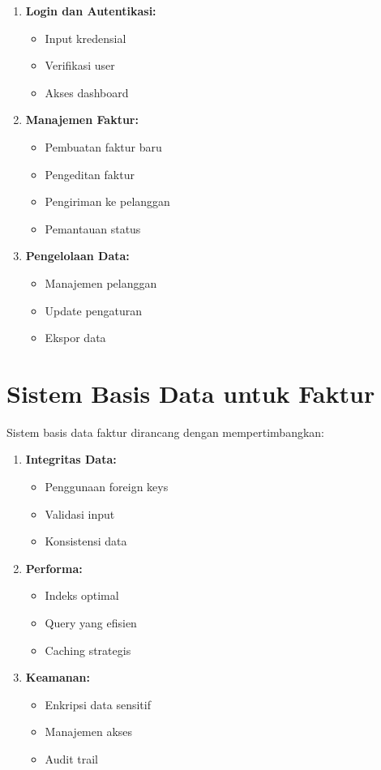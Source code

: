\documentclass[a4paper]{report}
\begin{document}
\begin{enumerate}
\item \textbf{Login dan Autentikasi:}
    \begin{itemize}
    \item Input kredensial
    \item Verifikasi user
    \item Akses dashboard
    \end{itemize}

\item \textbf{Manajemen Faktur:}
    \begin{itemize}
    \item Pembuatan faktur baru
    \item Pengeditan faktur
    \item Pengiriman ke pelanggan
    \item Pemantauan status
    \end{itemize}

\item \textbf{Pengelolaan Data:}
    \begin{itemize}
    \item Manajemen pelanggan
    \item Update pengaturan
    \item Ekspor data
    \end{itemize}
\end{enumerate}

\section{Sistem Basis Data untuk Faktur}
Sistem basis data faktur dirancang dengan mempertimbangkan:

\begin{enumerate}
\item \textbf{Integritas Data:}
    \begin{itemize}
    \item Penggunaan foreign keys
    \item Validasi input
    \item Konsistensi data
    \end{itemize}

\item \textbf{Performa:}
    \begin{itemize}
    \item Indeks optimal
    \item Query yang efisien
    \item Caching strategis
    \end{itemize}

\item \textbf{Keamanan:}
    \begin{itemize}
    \item Enkripsi data sensitif
    \item Manajemen akses
    \item Audit trail
    \end{itemize}
\end{enumerate}
\end{document}
